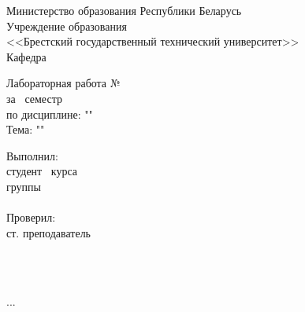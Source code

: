 \documentclass[12pt, a4paper, simple]{eskdtext}
\begin{document}
    \begin{ESKDtitlePage}
        \begin{center}
            Министерство образования Республики Беларусь\\
            Учреждение образования\\
            <<Брестский государственный технический университет>>\\
            Кафедра \titlePageKafedra\\
        \end{center}

        \vfill

        \begin{center}
            Лабораторная работа №\titlePageLabNumber\\
            за \titlePageSemestr~семестр\\
            по дисциплине: "\titlePageLesson"\\
            Тема: "\titlePageTopic"\\
        \end{center}

        \vfill

        \begin{flushright}
            \begin{minipage}[t]{7cm}
                Выполнил:\\
                студент \titlePageKurs~курса\\
                группы \titlePageGroup\\
                \titlePageStudentSurname~\titlePageStudentName\\

                Проверил:\\
                ст. преподаватель\\
                \titlePagePrepodSurname~\titlePagePrepodName\\
            \end{minipage}
        \end{flushright}

        \vfill

        \begin{center}
            \ESKDtheYear\\
        \end{center}
    \end{ESKDtitlePage}

    ...
\end{document}
